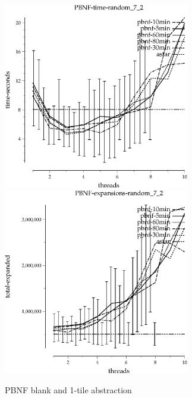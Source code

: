 \documentclass{article}
\begin{document}
\begin{figure}
\begin{center}
\includegraphics[width=3.2in]{tiles_random_7_2/PBNF-time-random_7_2}
\includegraphics[width=3.2in]{tiles_random_7_2/PBNF-expansions-random_7_2}
\end{center}
\caption{PBNF blank and 1-tile abstraction}
\end{figure}
\end{document}
